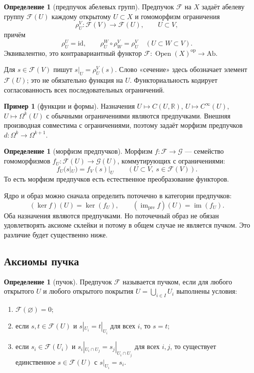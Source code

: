 \documentclass[11pt,b5paper,oneside]{article}
\newcommand{\F}{\mathscr F}
\newcommand{\G}{\mathscr G}
\newcommand{\Ab}{\mathrm{Ab}}
\newcommand{\id}{\mathrm{id}}
\newcommand{\res}{\rho}
\newcommand{\R}{\mathbb R}
\theoremstyle{plain}
\theoremstyle{definition}
\newtheorem{defn}[thm]{Определение}
\newtheorem{exm}[thm]{Пример}
\theoremstyle{remark}
\begin{document}
\begin{defn}[предпучок абелевых групп]
Предпучок $\F$ на $X$ задаёт абелеву группу $\F(U)$ каждому открытому
$U\subset X$ и гомоморфизм ограничения
\[
  \res^V_U:\F(V)\longrightarrow\F(U),\qquad U\subset V,
\]
причём
\[
  \res^U_U=\id,\qquad
  \res^W_U\circ\res^V_W=\res^V_U
  \quad(U\subset W\subset V).
\]
Эквивалентно, это контравариантный функтор
$\F:\operatorname{Open}(X)^{\mathrm{op}}\to\Ab$.
\end{defn}

Для $s\in\F(V)$ пишут $s|_U=\res^V_U(s)$. Слово «сечение» здесь
обозначает элемент $\F(U)$; это не обязательно функция на $U$.
Функториальность кодирует согласованность всех последовательных
ограничений.

\begin{exm}[функции и формы]
Назначения $U\mapsto C(U,\R)$, $U\mapsto C^\infty(U)$,
$U\mapsto\Omega^k(U)$ с обычными ограничениями являются предпучками.
Внешняя производная совместима с ограничениями, поэтому задаёт морфизм
предпучков $d:\Omega^k\to\Omega^{k+1}$.
\end{exm}

\begin{defn}[морфизм предпучков]
Морфизм $f:\F\to\G$ --- семейство гомоморфизмов
$f_U:\F(U)\to\G(U)$, коммутирующих с ограничениями:
\[
  f_U(s|_U)=f_V(s)|_U\qquad(U\subset V,\ s\in\F(V)).
\]
То есть морфизм предпучков есть естественное преобразование функторов.
\end{defn}

Ядро и образ можно сначала определить поточечно в категории предпучков:
\[
 (\ker f)(U)=\ker(f_U),\qquad
 (\operatorname{im}_{\mathrm{pre}} f)(U)=\operatorname{im}(f_U).
\]
Оба назначения являются предпучками. Но поточечный образ не обязан
удовлетворять аксиоме склейки и потому в общем случае не является
пучком. Это различие будет существенно ниже.

\subsection{Аксиомы пучка}
\begin{defn}[пучок]
Предпучок $\F$ называется пучком, если для любого открытого $U$ и любого
открытого покрытия $U=\bigcup_{i\in I}U_i$ выполнены условия:
\begin{enumerate}
\item[(F0)] $\F(\varnothing)=0$;
\item[(F1)] если $s,t\in\F(U)$ и $s|_{U_i}=t|_{U_i}$ для всех $i$, то
  $s=t$;
\item[(F2)] если $s_i\in\F(U_i)$ и
  $s_i|_{U_i\cap U_j}=s_j|_{U_i\cap U_j}$ для всех $i,j$, то существует
  единственное $s\in\F(U)$ с $s|_{U_i}=s_i$.
\end{enumerate}
\end{defn}
\end{document}
